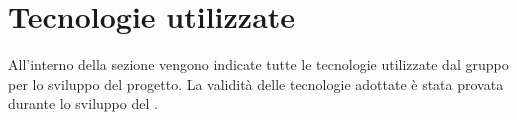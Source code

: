\section{Tecnologie utilizzate}
\label{sec:tecnologie_utilizzate}
All'interno della sezione vengono indicate tutte le tecnologie utilizzate dal gruppo per lo sviluppo del progetto.
La validità delle tecnologie adottate è stata provata durante lo sviluppo del .






